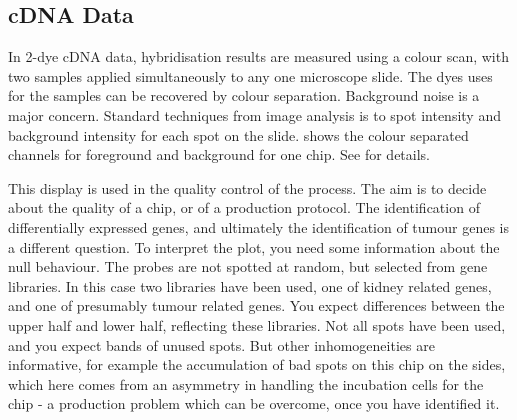\documentclass[nogin, dvips,12pt,a4paper,twoside]{amsart}
\begin{document}
\subsection{cDNA Data}
\label{sec:caseDNA}
\smallskip
In 2-dye cDNA data, hybridisation results are measured using a colour scan, with two samples applied simultaneously to any one microscope slide. The dyes uses for the samples can be recovered by colour separation.  Background noise is a major concern. Standard techniques from image analysis is to spot intensity and background intensity for each spot on the slide. shows the colour separated channels for foreground and background for one chip. See \cite{Rnews:Sawitzki:2002} for details.

This display is used in the quality control of the process. The aim is to decide about the quality of a chip, or of a production protocol. The identification of differentially expressed genes, and ultimately the identification of tumour genes is a different question. To interpret the plot, you need some information about the null behaviour. The probes are not spotted at random, but selected from  gene libraries. In this case two libraries have been used, one of kidney related genes, and one of presumably tumour related genes. You expect differences between the upper half and lower half, reflecting these libraries. Not all spots have been used, and you expect bands of unused spots. But other inhomogeneities are informative, for example the accumulation of bad spots on this chip on the sides, which here comes from an asymmetry in handling the incubation cells for the chip - a production problem which can be overcome, once you have identified it.
\end{document}
